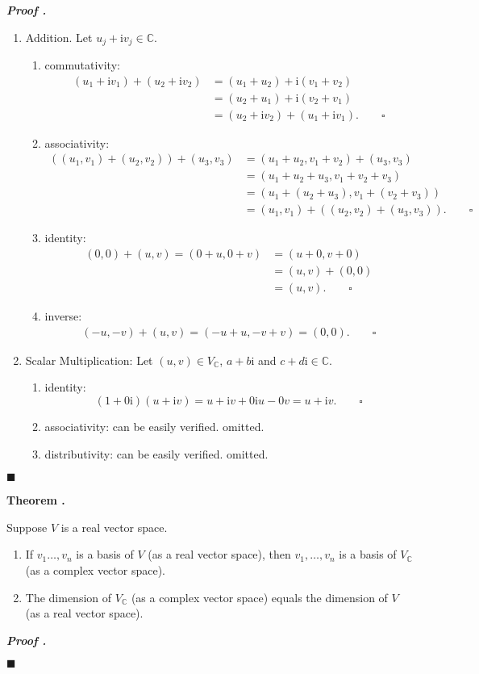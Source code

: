\documentclass[11pt, letterpaper]{article}
\newcounter{index}[subsection]
\newenvironment*{thm}[1]{\begin{tcolorbox}\par\noindent\textbf{Theorem \thesubsection.\stepcounter{index}\theindex\ #1} \par}{\par\end{tcolorbox}}
\newcounter{nprf}[subsection]
\newenvironment*{prf}{\par\indent\textbf{\textit{Proof \stepcounter{nprf}\thenprf.}}}{\hfill$\blacksquare$\par}
\def\C{\mathbb{C}}
\def\i{\mathrm{i}}
\def\pqde{\qquad\square}
\begin{document}
\begin{prf}
	\begin{enumerate}
		\item Addition. Let $u_j+\i v_j\in\C$. 
		\begin{enumerate}
			\item commutativity: \[\begin{aligned}(u_1+\i v_1)+(u_2+\i v_2)&=(u_1+u_2)+\i(v_1+v_2)\\&=(u_2+u_1)+\i(v_2+v_1)\\&=(u_2+\i v_2)+(u_1+\i v_1).\pqde\end{aligned}\]
			\item associativity: \[\begin{aligned}((u_1,v_1)+(u_2,v_2))+(u_3,v_3)&=(u_1+u_2,v_1+v_2)+(u_3,v_3)\\&=(u_1+u_2+u_3,v_1+v_2+v_3)\\&=(u_1+(u_2+u_3),v_1+(v_2+v_3))\\&=(u_1,v_1)+((u_2,v_2)+(u_3,v_3)).\pqde\end{aligned}\]
			\item identity: \[\begin{aligned}(0,0)+(u,v)=(0+u,0+v)&=(u+0,v+0)\\&=(u,v)+(0,0)\\&=(u,v).\pqde\end{aligned}\]
			\item inverse: \[\begin{aligned}(-u,-v)+(u,v)=(-u+u,-v+v)=(0,0).\pqde\end{aligned}\]
		\end{enumerate}
		\item Scalar Multiplication: Let $(u,v)\in V_\C$, $a+b\i$ and $c+d\i\in\C$.
		\begin{enumerate}
			\item identity: \[(1+0\i)(u+\i v)=u+\i v+0\i u-0v=u+\i v.\pqde\]
			\item associativity: can be easily verified. omitted.
			\item distributivity: can be easily verified. omitted.
		\end{enumerate}
	\end{enumerate}	
\end{prf}
\begin{thm}{}
	Suppose $V$ is a real vector space.
	\begin{enumerate}
		\item If $v_1\dots,v_n$ is a basis of $V$ (as a real vector space), then $v_1,\dots,v_n$ is a basis of $V_\C$ (as a complex vector space).
		\item The dimension of $V_\C$ (as a complex vector space) equals the dimension of $V$ (as a real vector space).
	\end{enumerate}	
\end{thm}
\begin{prf}
	
\end{prf}
\end{document}
